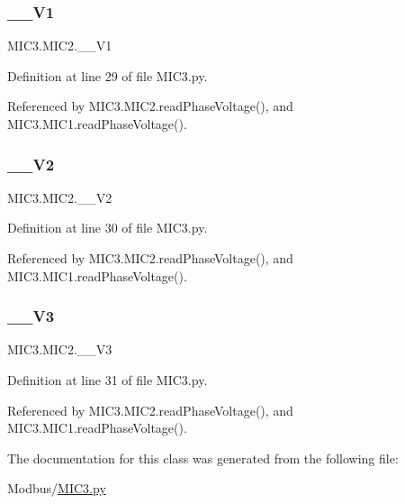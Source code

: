 \subsubsection{\texorpdfstring{\+\_\+\+\_\+\+V1}{\_\_V1}}
{\footnotesize\ttfamily M\+I\+C3.\+M\+I\+C2.\+\_\+\+\_\+\+V1\hspace{0.3cm}{\ttfamily [private]}}



Definition at line 29 of file M\+I\+C3.\+py.



Referenced by M\+I\+C3.\+M\+I\+C2.\+read\+Phase\+Voltage(), and M\+I\+C3.\+M\+I\+C1.\+read\+Phase\+Voltage().

\mbox{\label{class_m_i_c3_1_1_m_i_c2_a62869229c9de79f24a61d8a1043256e6}} 
\subsubsection{\texorpdfstring{\+\_\+\+\_\+\+V2}{\_\_V2}}
{\footnotesize\ttfamily M\+I\+C3.\+M\+I\+C2.\+\_\+\+\_\+\+V2\hspace{0.3cm}{\ttfamily [private]}}



Definition at line 30 of file M\+I\+C3.\+py.



Referenced by M\+I\+C3.\+M\+I\+C2.\+read\+Phase\+Voltage(), and M\+I\+C3.\+M\+I\+C1.\+read\+Phase\+Voltage().

\mbox{\label{class_m_i_c3_1_1_m_i_c2_aa35ac9a7cf922516057a46c213685997}} 
\subsubsection{\texorpdfstring{\+\_\+\+\_\+\+V3}{\_\_V3}}
{\footnotesize\ttfamily M\+I\+C3.\+M\+I\+C2.\+\_\+\+\_\+\+V3\hspace{0.3cm}{\ttfamily [private]}}



Definition at line 31 of file M\+I\+C3.\+py.



Referenced by M\+I\+C3.\+M\+I\+C2.\+read\+Phase\+Voltage(), and M\+I\+C3.\+M\+I\+C1.\+read\+Phase\+Voltage().



The documentation for this class was generated from the following file\+:\begin{DoxyCompactItemize}
\item 
Modbus/\hyperlink{_m_i_c3_8py}{M\+I\+C3.\+py}\end{DoxyCompactItemize}
